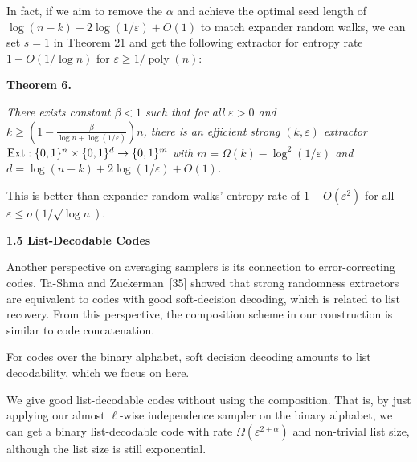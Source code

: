 \documentclass[10pt,a4paper]{article}
\begin{document}
In fact, if we aim to remove the $\alpha$ and achieve the optimal seed length of $\log(n-k)+2\log(1/\varepsilon)+O(1)$ to match expander random walks, we can set $s=1$ in Theorem 21 and get the following extractor for entropy rate $1-O(1/\log n)$ for $\varepsilon\geq 1/\operatorname*{poly}(n)$:\par





\par\medskip\noindent\textbf{
\textbf{Theorem 6}\textbf{.}
}\par



\emph{There exists constant $\beta<1$ such that for all $\varepsilon>0$ and $k\geq(1-\frac{\beta}{\log n+\log(1/\varepsilon)})n$, there is an efficient strong $(k,\varepsilon)$ extractor $\textup{{Ext}}:\{0,1\}^{n}\times\{0,1\}^{d}\to\{0,1\}^{m}$ with $m=\Omega(k)-\log^{2}(1/\varepsilon)$ and $d=\log(n-k)+2\log(1/\varepsilon)+O(1)$.}\par






This is better than expander random walks’ entropy rate of $1-O(\varepsilon^{2})$ for all $\varepsilon\leq o(1/\sqrt{\log n})$.\par





\par\medskip\noindent\textbf{
1.5 List-Decodable Codes}\par




Another perspective on averaging samplers is its connection to error-correcting codes.
Ta-Shma and Zuckerman [35] showed that strong randomness extractors are equivalent to codes with good soft-decision decoding, which is related to list recovery.
From this perspective, the composition scheme in our construction is similar to code concatenation.\par




For codes over the binary alphabet, soft decision decoding amounts to list decodability, which we focus on here.\par




We give good list-decodable codes without using the composition. That is, by just applying our almost $\ell$-wise independence sampler on the binary alphabet, we can get a binary list-decodable code with rate $\Omega(\varepsilon^{2+\alpha})$ and non-trivial list size, although the list size is still exponential.\par
\end{document}
